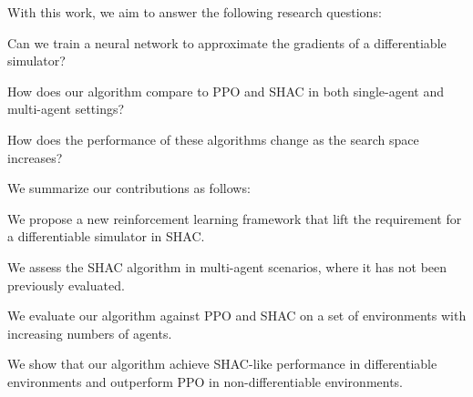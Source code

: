 With this work, we aim to answer the following research questions:
\begin{compactitem}
    \item {} Can we train a neural network to approximate the gradients of a differentiable simulator?
    \item {} How does our algorithm compare to PPO and SHAC in both single-agent and multi-agent settings?
    \item {} How does the performance of these algorithms change as the search space increases?
\end{compactitem}

We summarize our contributions as follows:
\begin{compactitem}
    \item We propose a new reinforcement learning framework that lift the requirement for a differentiable simulator in SHAC.
    \item We assess the SHAC algorithm in multi-agent scenarios, where it has not been previously evaluated.
    \item We evaluate our algorithm against PPO and SHAC on a set of environments with increasing numbers of agents.
    \item We show that our algorithm achieve SHAC-like performance in differentiable environments and outperform PPO in non-differentiable environments.
\end{compactitem}


